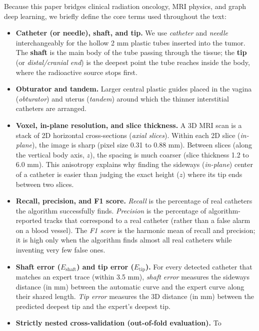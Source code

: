 \documentclass[
  11pt,
]{article}
\providecommand{\tightlist}{%
  \setlength{\itemsep}{0pt}\setlength{\parskip}{0pt}}
\begin{document}
Because this paper bridges clinical radiation oncology, MRI physics, and
graph deep learning, we briefly define the core terms used throughout
the text:

\begin{itemize}
\tightlist
\item
  \textbf{Catheter (or needle), shaft, and tip.} We use \emph{catheter}
  and \emph{needle} interchangeably for the hollow 2 mm plastic tubes
  inserted into the tumor. The \textbf{shaft} is the main body of the
  tube passing through the tissue; the \textbf{tip} (or
  \emph{distal/cranial end}) is the deepest point the tube reaches
  inside the body, where the radioactive source stops first.
\item
  \textbf{Obturator and tandem.} Larger central plastic guides placed in
  the vagina (\emph{obturator}) and uterus (\emph{tandem}) around which
  the thinner interstitial catheters are arranged.
\item
  \textbf{Voxel, in-plane resolution, and slice thickness.} A 3D MRI
  scan is a stack of 2D horizontal cross-sections (\emph{axial slices}).
  Within each 2D slice (\emph{in-plane}), the image is sharp (pixel size
  0.31 to 0.88 mm). Between slices (along the vertical body axis,
  \(z\)), the spacing is much coarser (slice thickness 1.2 to 6.0 mm).
  This anisotropy explains why finding the sideways (\emph{in-plane})
  center of a catheter is easier than judging the exact height (\(z\))
  where its tip ends between two slices.
\item
  \textbf{Recall, precision, and F1 score.} \emph{Recall} is the
  percentage of real catheters the algorithm successfully finds.
  \emph{Precision} is the percentage of algorithm-reported tracks that
  correspond to a real catheter (rather than a false alarm on a blood
  vessel). The \emph{F1 score} is the harmonic mean of recall and
  precision; it is high only when the algorithm finds almost all real
  catheters while inventing very few false ones.
\item
  \textbf{Shaft error (\(E_{\text{shaft}}\)) and tip error
  (\(E_{\text{tip}}\)).} For every detected catheter that matches an
  expert trace (within 3.5 mm), \emph{shaft error} measures the sideways
  distance (in mm) between the automatic curve and the expert curve
  along their shared length. \emph{Tip error} measures the 3D distance
  (in mm) between the predicted deepest tip and the expert's deepest
  tip.
\item
  \textbf{Strictly nested cross-validation (out-of-fold evaluation).} To

\end{itemize}
\end{document}
